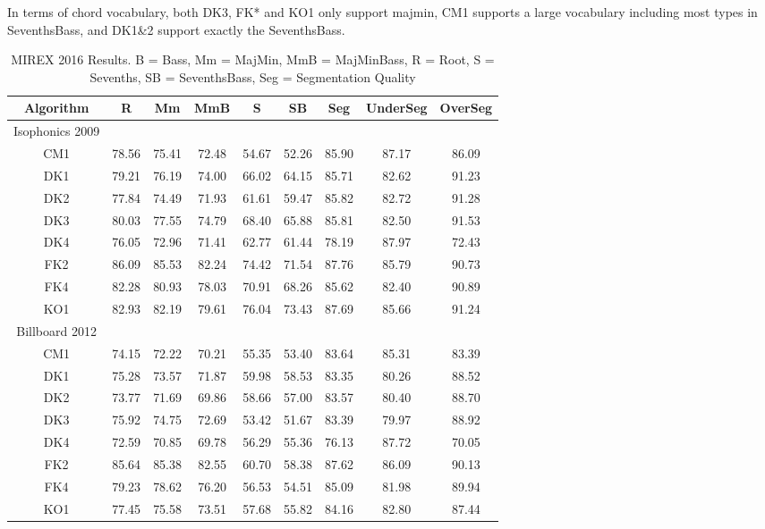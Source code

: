 In terms of chord vocabulary, both DK3, FK* and KO1 only support majmin, CM1 supports a large vocabulary including most types in SeventhsBass, and DK1\&2 support exactly the SeventhsBass.

\begin{table*}[htb]
\centering
\scriptsize
\caption{MIREX 2016 Results. B = Bass, Mm = MajMin, MmB = MajMinBass, R = Root, S = Sevenths, SB = SeventhsBass, Seg = Segmentation Quality}
\label{tab:3-mirex2016}
\begin{tabular}{|c|c|c|c|c|c|c|c|c|}\hline
Algorithm & R & Mm & MmB & S & SB & Seg & UnderSeg & OverSeg \\ \hline
Isophonics 2009\\ \hline
CM1 & 78.56 & 75.41 & 72.48 & 54.67 & 52.26 & 85.90 & 87.17 & 86.09\\ \hline
DK1 & 79.21 & 76.19 & 74.00 & 66.02 & 64.15 & 85.71 & 82.62 & 91.23\\ \hline
DK2 & 77.84 & 74.49 & 71.93 & 61.61 & 59.47 & 85.82 & 82.72 & 91.28\\ \hline
DK3 & 80.03 & 77.55 & 74.79 & 68.40 & 65.88 & 85.81 & 82.50 & 91.53\\ \hline
DK4 & 76.05 & 72.96 & 71.41 & 62.77 & 61.44 & 78.19 & 87.97 & 72.43\\ \hline
FK2 & 86.09 & 85.53 & 82.24 & 74.42 & 71.54 & 87.76 & 85.79 & 90.73\\ \hline
FK4 & 82.28 & 80.93 & 78.03 & 70.91 & 68.26 & 85.62 & 82.40 & 90.89\\ \hline
KO1 & 82.93 & 82.19 & 79.61 & 76.04 & 73.43 & 87.69 & 85.66 & 91.24\\ \hline
Billboard 2012 \\ \hline
CM1 & 74.15 & 72.22 & 70.21 & 55.35 & 53.40 & 83.64 & 85.31 & 83.39\\ \hline
DK1 & 75.28 & 73.57 & 71.87 & 59.98 & 58.53 & 83.35 & 80.26 & 88.52\\ \hline
DK2 & 73.77 & 71.69 & 69.86 & 58.66 & 57.00 & 83.57 & 80.40 & 88.70\\ \hline
DK3 & 75.92 & 74.75 & 72.69 & 53.42 & 51.67 & 83.39 & 79.97 & 88.92\\ \hline
DK4 & 72.59 & 70.85 & 69.78 & 56.29 & 55.36 & 76.13 & 87.72 & 70.05\\ \hline
FK2 & 85.64 & 85.38 & 82.55 & 60.70 & 58.38 & 87.62 & 86.09 & 90.13\\ \hline
FK4 & 79.23 & 78.62 & 76.20 & 56.53 & 54.51 & 85.09 & 81.98 & 89.94\\ \hline
KO1 & 77.45 & 75.58 & 73.51 & 57.68 & 55.82 & 84.16 & 82.80 & 87.44\\ \hline

\end{tabular}
\end{table*}
